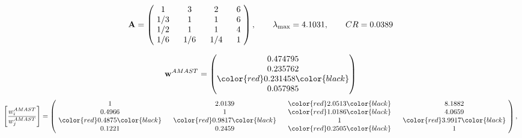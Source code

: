 \begin{example}
\begin{equation*}
\mathbf{A} =
\begin{pmatrix}
$\,\,$ 1 $\,\,$ & $\,\,$3$\,\,$ & $\,\,$2$\,\,$ & $\,\,$6 $\,\,$ \\
$\,\,$ 1/3$\,\,$ & $\,\,$ 1 $\,\,$ & $\,\,$1$\,\,$ & $\,\,$6 $\,\,$ \\
$\,\,$ 1/2$\,\,$ & $\,\,$ 1 $\,\,$ & $\,\,$ 1 $\,\,$ & $\,\,$4 $\,\,$ \\
$\,\,$ 1/6$\,\,$ & $\,\,$ 1/6$\,\,$ & $\,\,$ 1/4$\,\,$ & $\,\,$ 1  $\,\,$ \\
\end{pmatrix},
\qquad
\lambda_{\max} =
4.1031,
\qquad
CR = 0.0389
\end{equation*}

\begin{equation*}
\mathbf{w}^{AMAST} =
\begin{pmatrix}
0.474795\\
0.235762\\
\color{red} 0.231458\color{black} \\
0.057985
\end{pmatrix}\end{equation*}
\begin{equation*}
\left[ \frac{{w}^{AMAST}_i}{{w}^{AMAST}_j} \right] =
\begin{pmatrix}
$\,\,$ 1 $\,\,$ & $\,\,$2.0139$\,\,$ & $\,\,$\color{red} 2.0513\color{black} $\,\,$ & $\,\,$8.1882$\,\,$ \\
$\,\,$0.4966$\,\,$ & $\,\,$ 1 $\,\,$ & $\,\,$\color{red} 1.0186\color{black} $\,\,$ & $\,\,$4.0659  $\,\,$ \\
$\,\,$\color{red} 0.4875\color{black} $\,\,$ & $\,\,$\color{red} 0.9817\color{black} $\,\,$ & $\,\,$ 1 $\,\,$ & $\,\,$\color{red} 3.9917\color{black}  $\,\,$ \\
$\,\,$0.1221$\,\,$ & $\,\,$0.2459$\,\,$ & $\,\,$\color{red} 0.2505\color{black} $\,\,$ & $\,\,$ 1  $\,\,$ \\
\end{pmatrix},
\end{equation*}


\end{example}
